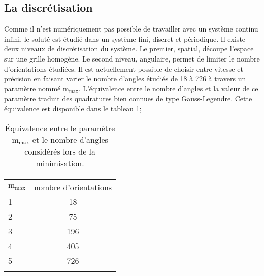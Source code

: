 \subsection{La discrétisation}
Comme il n'est numériquement pas possible de travailler avec un système continu infini, le soluté est étudié dans un système fini, discret et périodique. Il existe deux niveaux de discrétisation du système. Le premier, spatial, découpe l'espace sur une grille homogène. Le second niveau, angulaire\cite{ding_cea-01564512}, permet de limiter le nombre d'orientations étudiées. Il est actuellement possible de choisir entre vitesse et précision en faisant varier le nombre d'angles étudiés de 18 à 726 à travers un paramètre nommé $\mathrm{m}_\mathrm{max}$. L'équivalence entre le nombre d'angles et la valeur de ce paramètre traduit des quadratures bien connues de type Gauss-Legendre\cite{abbott_tricks_2005}. Cette équivalence est disponible dans le tableau \ref{tab:mmax};

\begin{table}[H]
 \centering
  \begin{tabular}{l | c}
    \hline \multicolumn{2}{c}{} \\[-1em]\hline
    $\mathrm{m}_\mathrm{max}$ & nombre d'orientations \\
    \hline
    1  & 18 \\
    2  & 75 \\
    3  & 196 \\
    4  & 405 \\
    5  & 726 \\
    \hline \multicolumn{2}{c}{} \\[-1em]\hline
  \end{tabular}
  \caption[\'Equivalence entre le paramètre $\mathrm{m}_\mathrm{max}$ et le nombre d'angles.]{\'Equivalence entre le paramètre $\mathrm{m}_\mathrm{max}$ et le nombre d'angles considérés lors de la minimisation.}
  \label{tab:mmax}  
\end{table}


